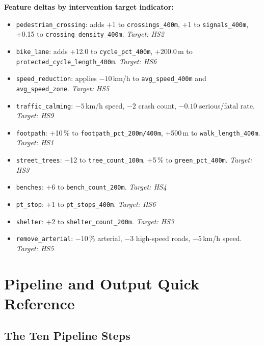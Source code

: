 \documentclass[11pt,a4paper,openany]{book}
\begin{document}
\textbf{Feature deltas by intervention target indicator:}
\begin{itemize}
  \item \texttt{pedestrian\_crossing}: adds +1 to \texttt{crossings\_400m},
    +1 to \texttt{signals\_400m}, +0.15 to \texttt{crossing\_density\_400m}. \hfill
    \emph{Target: HS2}
  \item \texttt{bike\_lane}: adds +12.0 to \texttt{cycle\_pct\_400m},
    +200.0\,m to \texttt{protected\_cycle\_length\_400m}. \hfill \emph{Target: HS6}
  \item \texttt{speed\_reduction}: applies $-10$\,km/h to \texttt{avg\_speed\_400m}
    and \texttt{avg\_speed\_zone}. \hfill \emph{Target: HS5}
  \item \texttt{traffic\_calming}: $-5$\,km/h speed, $-2$ crash count, $-0.10$
    serious/fatal rate. \hfill \emph{Target: HS9}
  \item \texttt{footpath}: +10\,\% to \texttt{footpath\_pct\_200m/400m},
    +500\,m to \texttt{walk\_length\_400m}. \hfill \emph{Target: HS1}
  \item \texttt{street\_trees}: +12 to \texttt{tree\_count\_100m},
    +5\,\% to \texttt{green\_pct\_400m}. \hfill \emph{Target: HS3}
  \item \texttt{benches}: +6 to \texttt{bench\_count\_200m}. \hfill \emph{Target: HS4}
  \item \texttt{pt\_stop}: +1 to \texttt{pt\_stops\_400m}. \hfill \emph{Target: HS6}
  \item \texttt{shelter}: +2 to \texttt{shelter\_count\_200m}. \hfill \emph{Target: HS3}
  \item \texttt{remove\_arterial}: $-10$\,\% arterial, $-3$ high-speed roads,
    $-5$\,km/h speed. \hfill \emph{Target: HS5}
\end{itemize}

\chapter{Pipeline and Output Quick Reference}

\section*{The Ten Pipeline Steps}
\end{document}

